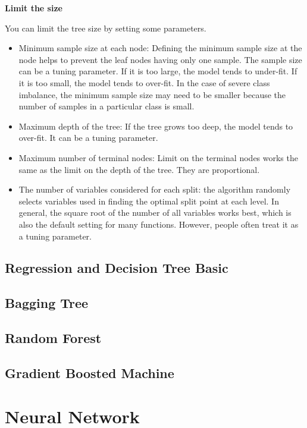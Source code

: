 \documentclass[12pt,]{krantz}
\theoremstyle{definition}
\theoremstyle{definition}
\theoremstyle{definition}
\theoremstyle{remark}
\begin{document}
\textbf{Limit the size}

You can limit the tree size by setting some parameters.

\begin{itemize}
\item
  Minimum sample size at each node: Defining the minimum sample size at
  the node helps to prevent the leaf nodes having only one sample. The
  sample size can be a tuning parameter. If it is too large, the model
  tends to under-fit. If it is too small, the model tends to over-fit.
  In the case of severe class imbalance, the minimum sample size may
  need to be smaller because the number of samples in a particular class
  is small.
\item
  Maximum depth of the tree: If the tree grows too deep, the model tends
  to over-fit. It can be a tuning parameter.
\item
  Maximum number of terminal nodes: Limit on the terminal nodes works
  the same as the limit on the depth of the tree. They are proportional.
\item
  The number of variables considered for each split: the algorithm
  randomly selects variables used in finding the optimal split point at
  each level. In general, the square root of the number of all variables
  works best, which is also the default setting for many functions.
  However, people often treat it as a tuning parameter.
\end{itemize}

\section{Regression and Decision Tree
Basic}\label{regression-and-decision-tree-basic}

\section{Bagging Tree}\label{bagging-tree-1}

\section{Random Forest}\label{random-forest}

\section{Gradient Boosted Machine}\label{gradient-boosted-machine}

\chapter{Neural Network}\label{neural-network}
\end{document}
